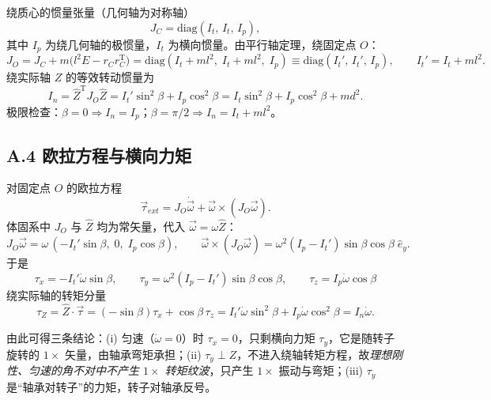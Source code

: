 绕质心的惯量张量（几何轴为对称轴）
\begin{equation}
J_C=\mathrm{diag}(I_t,\,I_t,\,I_p),
\end{equation}
其中 $I_p$ 为绕几何轴的极惯量，$I_t$ 为横向惯量。由平行轴定理，绕固定点 $O$：
\begin{equation}
J_O=J_C+m\bigl(l^2E-r_Cr_C^{\mathrm T}\bigr)
=\mathrm{diag}(I_t+ml^2,\;I_t+ml^2,\;I_p)
\equiv\mathrm{diag}(I_t',\,I_t',\,I_p),
\qquad I_t'=I_t+ml^2 .
\end{equation}
绕实际轴 $Z$ 的等效转动惯量为
\begin{equation}
I_n=\hat Z^{\mathrm T}J_O\hat Z
=I_t'\sin^2\beta+I_p\cos^2\beta
=I_t\sin^2\beta+I_p\cos^2\beta+m d^2 .
\label{eq:app-In}
\end{equation}
极限检查：$\beta=0\Rightarrow I_n=I_p$；$\beta=\pi/2\Rightarrow I_n=I_t+ml^2$。

\subsection*{A.4 欧拉方程与横向力矩}

对固定点 $O$ 的欧拉方程
\begin{equation}
\vec\tau_{ext}=J_O\dot{\vec\omega}+\vec\omega\times(J_O\vec\omega).
\label{eq:app-euler}
\end{equation}
体固系中 $J_O$ 与 $\hat Z$ 均为常矢量，代入 $\vec\omega=\omega\hat Z$：
\begin{equation}
J_O\vec\omega=\omega\,(-I_t'\sin\beta,\;0,\;I_p\cos\beta),
\qquad
\vec\omega\times(J_O\vec\omega)
=\omega^2(I_p-I_t')\sin\beta\cos\beta\;\hat e_y .
\end{equation}
于是
\begin{equation}
\boxed{\;\tau_x=-I_t'\dot\omega\sin\beta,\qquad
\tau_y=\omega^2(I_p-I_t')\sin\beta\cos\beta,\qquad
\tau_z=I_p\dot\omega\cos\beta\;}
\label{eq:app-tau}
\end{equation}
绕实际轴的转矩分量
\begin{equation}
\tau_Z=\hat Z\cdot\vec\tau
=(-\sin\beta)\tau_x+\cos\beta\,\tau_z
=I_t'\dot\omega\sin^2\beta+I_p\dot\omega\cos^2\beta
=I_n\dot\omega .
\label{eq:app-tauZ}
\end{equation}

由此可得三条结论：(i) 匀速（$\dot\omega=0$）时 $\tau_x=0$，只剩横向力矩 $\tau_y$，它是随转子旋转的 $1\times$ 矢量，由轴承弯矩承担；(ii) $\tau_y\perp Z$，不进入绕轴转矩方程，故\emph{理想刚性、匀速的角不对中不产生 $1\times$ 转矩纹波}，只产生 $1\times$ 振动与弯矩；(iii) $\tau_y$ 是“轴承对转子”的力矩，转子对轴承反号。

